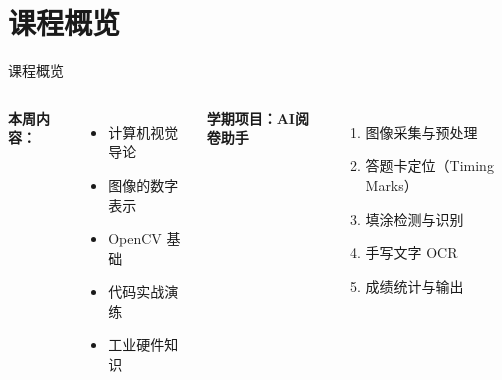 \documentclass[aspectratio=169, 12pt]{beamer}
\institute{%
    \begin{minipage}{6cm}
        \centering
        \textbf{北京石油化工学院}\\
        \textit{人工智能研究院}
    \end{minipage}
}
\begin{document}
\begin{frame}
    \titlepage
\end{frame}

\section*{课程概览}
\begin{frame}{课程概览}
    \begin{columns}
        \textbf{本周内容：}
        \begin{itemize}
            \item 计算机视觉导论
            \item 图像的数字表示
            \item OpenCV 基础
            \item 代码实战演练
            \item 工业硬件知识
        \end{itemize}

        \textbf{学期项目：AI阅卷助手}
        \begin{enumerate}
            \item 图像采集与预处理
            \item 答题卡定位（Timing Marks）
            \item 填涂检测与识别
            \item 手写文字 OCR
            \item 成绩统计与输出
        \end{enumerate}
    \end{columns}
\end{frame}
\end{document}
